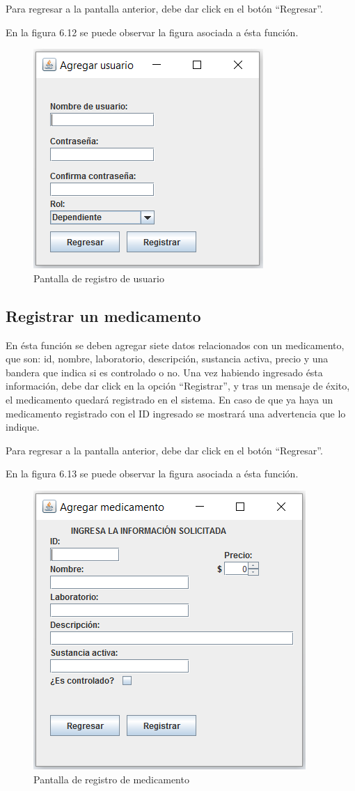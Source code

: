 Para regresar a la pantalla anterior, debe dar click en el bot\'on "`Regresar"'.

En la figura 6.12 se puede observar la figura asociada a \'esta funci\'on.

\begin{figure}[htbp!]
		\centering		
	\end{figure}
\begin{figure}[htbp!]
\centering
		\includegraphics[width=.5\textwidth]{images/gui/IUAgregarUsuario}
		\caption{Pantalla de registro de usuario}
\end{figure}
\subsection{Registrar un medicamento}
En \'esta funci\'on se deben agregar siete datos relacionados con un medicamento, que son: id, nombre, laboratorio, descripci\'on, sustancia activa, precio y una bandera que indica si es controlado o no.
Una vez habiendo ingresado \'esta informaci\'on, debe dar click en la opci\'on "`Registrar"', y tras un mensaje de \'exito, el medicamento quedar\'a registrado en el sistema. En caso de que ya haya un medicamento registrado con el ID ingresado se mostrar\'a una advertencia que lo indique.


Para regresar a la pantalla anterior, debe dar click en el bot\'on "`Regresar"'.

En la figura 6.13 se puede observar la figura asociada a \'esta funci\'on.

\begin{figure}[htbp!]
		\centering		
	\end{figure}
\begin{figure}[htbp!]
\centering
		\includegraphics[width=.5\textwidth]{images/gui/IUAgregarMedicamento}
		\caption{Pantalla de registro de medicamento}
\end{figure}


